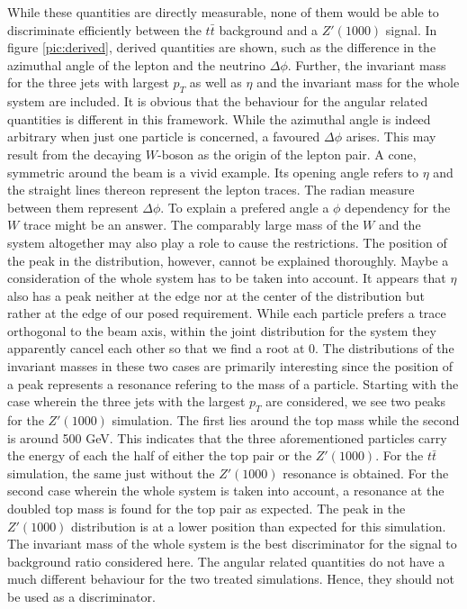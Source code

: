 While these quantities are directly measurable, none of them would be able to discriminate efficiently between the $t\bar t$ background and a $Z'(1000)$ 
signal. In figure \ref{pic:derived}, derived quantities are shown, such as the difference in the azimuthal angle of the lepton and the neutrino
$\Delta \phi$. Further, the invariant mass for the three jets with largest $p_T$ as well as $\eta$ and the invariant mass for the whole system
are included. It is obvious that the behaviour for the angular related quantities is different in this framework. While the azimuthal angle is indeed
arbitrary when just one particle is concerned, a favoured $\Delta\phi$ arises. This may result from the decaying $W$-boson as the origin of the lepton
pair. A cone, symmetric around the beam is a vivid example. Its opening angle refers to $\eta$ and the straight lines thereon represent the lepton 
traces. The radian measure between them represent $\Delta \phi$. To explain a prefered angle a $\phi$ dependency for the $W$ trace might be an answer.
The comparably large mass of the $W$ and the system altogether may also play a role to cause the restrictions.
The position of the peak in the distribution, however, cannot be explained thoroughly. Maybe a consideration of the whole system has to be taken
into account. It appears that $\eta$ also has a peak neither at the edge nor at the center of the distribution but rather at the edge of our posed
requirement. While each particle prefers a trace orthogonal to the beam axis, within the joint distribution for the system they apparently cancel each other so that
we find a root at 0. The distributions of the invariant masses in these two cases are primarily interesting since the position of a peak represents
a resonance refering to the mass of a particle. Starting with the case wherein the three jets with the largest $p_T$ are considered, we see two peaks
for the $Z'(1000)$ simulation. The first lies around the top mass while the second is around 500 GeV. This indicates that the three aforementioned particles
carry the energy of each the half of either the top pair or the $Z'(1000)$. For the $t\bar t$ simulation, the same just without the $Z'(1000)$ resonance is 
obtained. For the second case wherein the whole system is taken into account, a resonance at the doubled top mass is found for the top pair 
as expected. The peak in the $Z'(1000)$ distribution is at a lower position than expected for this simulation. The invariant mass of the whole system
is the best discriminator for the signal to background ratio considered here. The angular related quantities do not have a much different behaviour 
for the two treated simulations. Hence, they should not be used as a discriminator. 

